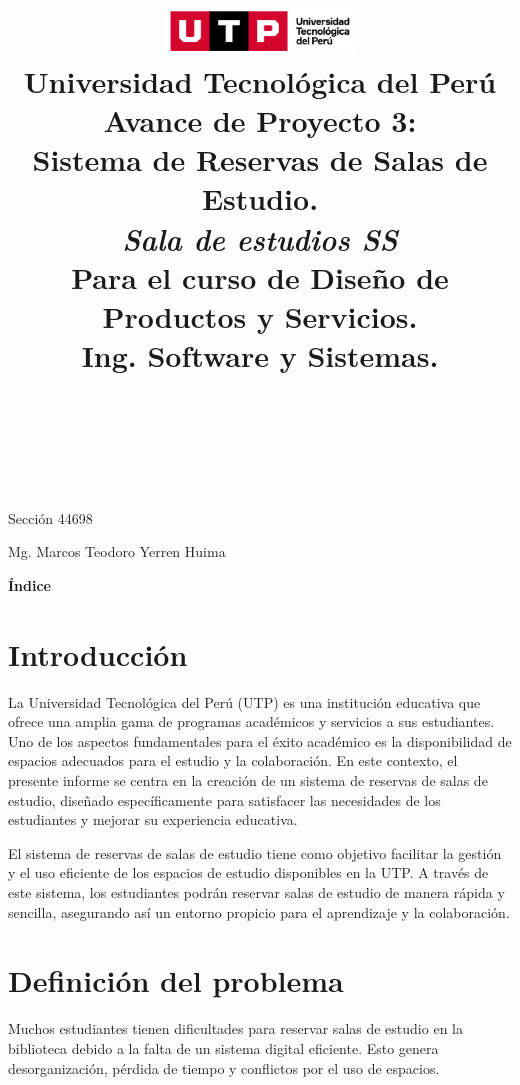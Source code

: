 \documentclass{article}
\title{
  \includegraphics[width=5cm]{./assets/logo-utp.png} \\
  \vspace{1cm}
  \textbf{Universidad Tecnológica del Perú} \\
  \vspace{2cm}
  \textbf{Avance de Proyecto 3:\\Sistema de Reservas de Salas de Estudio.\\\textit{Sala de estudios SS}} \\
  \vspace{1cm}
  \large \textbf{Para el curso de Diseño de Productos y Servicios.} \\
  \large \textbf{Ing. Software y Sistemas.}
}
\author{
  \text{Luis Huatay Salcedo.} \\
  \text{Garcia Chumpitaz Cindel Roxell.} \\
  \text{Díaz Benítez, Fernando Raúl.} \\
  \text{Quispe Fernandez, Bryan Alexander.}
}
\begin{document}
\maketitle
\begin{center}
  Sección 44698
\end{center}
\thispagestyle{empty}
\begin{center}
  Mg. Marcos Teodoro Yerren Huima  
\end{center}
\restoregeometry

\newpage
\begin{center}
  \textbf{\Large Índice}
\end{center}
\vspace{0.5cm} %
\begin{spacing}{1.15} %
  \tableofcontents
\end{spacing}

\newpage
\vspace*{\fill}
\section{Introducción}
La Universidad Tecnológica del Perú (UTP) es una institución educativa que ofrece una amplia gama de programas académicos y servicios a sus estudiantes. Uno de los aspectos fundamentales para el éxito académico es la disponibilidad de espacios adecuados para el estudio y la colaboración. En este contexto, el presente informe se centra en la creación de un sistema de reservas de salas de estudio, diseñado específicamente para satisfacer las necesidades de los estudiantes y mejorar su experiencia educativa.

El sistema de reservas de salas de estudio tiene como objetivo facilitar la gestión y el uso eficiente de los espacios de estudio disponibles en la UTP. A través de este sistema, los estudiantes podrán reservar salas de estudio de manera rápida y sencilla, asegurando así un entorno propicio para el aprendizaje y la colaboración.
\vspace*{\fill}

\newpage

\section{Definición del problema}

Muchos estudiantes tienen dificultades para reservar salas de estudio en la biblioteca 
debido a la falta de un sistema digital eficiente. Esto genera desorganización, pérdida de tiempo y conflictos por el uso de espacios.
\end{document}
